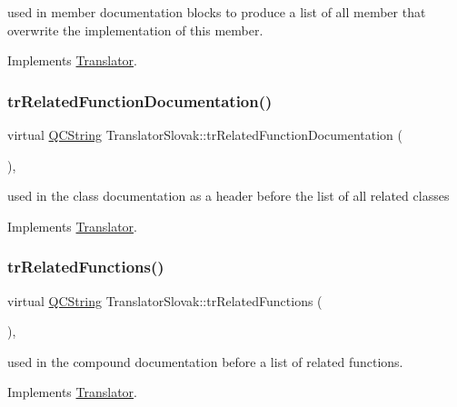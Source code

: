 used in member documentation blocks to produce a list of all member that overwrite the implementation of this member. 

Implements \mbox{\hyperlink{class_translator}{Translator}}.

\mbox{\label{class_translator_slovak_a0b6f8ec08f7a9f8fa38bfda25c225f3c}} 
\subsubsection{\texorpdfstring{trRelatedFunctionDocumentation()}{trRelatedFunctionDocumentation()}}
{\footnotesize\ttfamily virtual \mbox{\hyperlink{class_q_c_string}{Q\+C\+String}} Translator\+Slovak\+::tr\+Related\+Function\+Documentation (\begin{DoxyParamCaption}{ }\end{DoxyParamCaption})\hspace{0.3cm}{\ttfamily [inline]}, {\ttfamily [virtual]}}

used in the class documentation as a header before the list of all related classes 

Implements \mbox{\hyperlink{class_translator}{Translator}}.

\mbox{\label{class_translator_slovak_af3a23ecca41b6e87e3d51b461b5311bb}} 
\subsubsection{\texorpdfstring{trRelatedFunctions()}{trRelatedFunctions()}}
{\footnotesize\ttfamily virtual \mbox{\hyperlink{class_q_c_string}{Q\+C\+String}} Translator\+Slovak\+::tr\+Related\+Functions (\begin{DoxyParamCaption}{ }\end{DoxyParamCaption})\hspace{0.3cm}{\ttfamily [inline]}, {\ttfamily [virtual]}}

used in the compound documentation before a list of related functions. 

Implements \mbox{\hyperlink{class_translator}{Translator}}.

